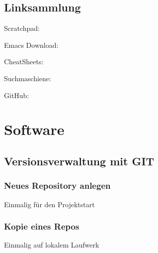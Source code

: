 \documentclass[letterpaper,10pt,ngerman]{sphinxmanual}
\begin{document}
\section{Linksammlung}
\label{\detokenize{emacs/emacs-basics:linksammlung}}
\sphinxAtStartPar
Scratchpad: 

\sphinxAtStartPar
Emacs Download: 

\sphinxAtStartPar
Cheat\sphinxhyphen{}Sheets: 

\sphinxAtStartPar
Suchmaschiene: 

\sphinxAtStartPar
GitHub: 

\sphinxstepscope


\chapter{Software}
\label{\detokenize{software/index:software}}\label{\detokenize{software/index::doc}}
\sphinxstepscope


\section{Versionsverwaltung mit GIT}
\label{\detokenize{software/git:versionsverwaltung-mit-git}}\label{\detokenize{software/git::doc}}

\subsection{Neues Repository anlegen}
\label{\detokenize{software/git:neues-repository-anlegen}}
\sphinxAtStartPar
Einmalig für den Projektstart

\begin{sphinxVerbatim}[commandchars=\\\{\}]
 
  
\end{sphinxVerbatim}


\subsection{Kopie eines Repos}
\label{\detokenize{software/git:kopie-eines-repos}}
\sphinxAtStartPar
Einmalig auf lokalem Laufwerk
\end{document}
